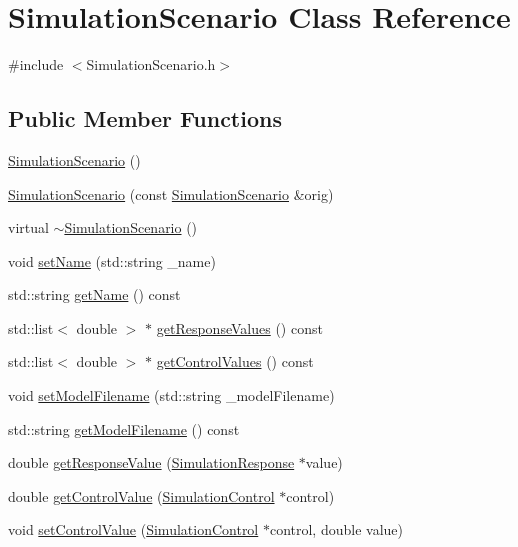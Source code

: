 \hypertarget{class_simulation_scenario}{\section{Simulation\-Scenario Class Reference}
\label{class_simulation_scenario}
}


{\ttfamily \#include $<$Simulation\-Scenario.\-h$>$}

\subsection*{Public Member Functions}
\begin{DoxyCompactItemize}
\item 
\hyperlink{class_simulation_scenario_a765c34df448f223ea0c7c08631b3c5bf}{Simulation\-Scenario} ()
\item 
\hyperlink{class_simulation_scenario_a1eb84bad959ba23ee92a10e8d5d47cbc}{Simulation\-Scenario} (const \hyperlink{class_simulation_scenario}{Simulation\-Scenario} \&orig)
\item 
virtual \hyperlink{class_simulation_scenario_a4926deb52c192cd994cd57c753b985a6}{$\sim$\-Simulation\-Scenario} ()
\item 
void \hyperlink{class_simulation_scenario_a26d4cb5d3b9b9fbc5d23a70ef8a6f132}{set\-Name} (std\-::string \-\_\-name)
\item 
std\-::string \hyperlink{class_simulation_scenario_af724f4ff5cbdba527ee60c8cbaba0da0}{get\-Name} () const 
\item 
std\-::list$<$ double $>$ $\ast$ \hyperlink{class_simulation_scenario_a344580e94b9bbab4f89398cff8362620}{get\-Response\-Values} () const 
\item 
std\-::list$<$ double $>$ $\ast$ \hyperlink{class_simulation_scenario_adc766594ca8fe040cd4a0824d72ab69d}{get\-Control\-Values} () const 
\item 
void \hyperlink{class_simulation_scenario_ac9ac9d8dbec7e76c8c47e8f0d15d8406}{set\-Model\-Filename} (std\-::string \-\_\-model\-Filename)
\item 
std\-::string \hyperlink{class_simulation_scenario_a7c2e05a2502e9bb601305c1df4d92fd3}{get\-Model\-Filename} () const 
\item 
double \hyperlink{class_simulation_scenario_a771892cb0d3361006694713c1013cfbe}{get\-Response\-Value} (\hyperlink{class_simulation_response}{Simulation\-Response} $\ast$value)
\item 
double \hyperlink{class_simulation_scenario_aa12e1c77a7933773585f8683f36ca629}{get\-Control\-Value} (\hyperlink{class_simulation_control}{Simulation\-Control} $\ast$control)
\item 
void \hyperlink{class_simulation_scenario_a673e153baadc970e1cd4d97aa46b1af0}{set\-Control\-Value} (\hyperlink{class_simulation_control}{Simulation\-Control} $\ast$control, double value)
\end{DoxyCompactItemize}


